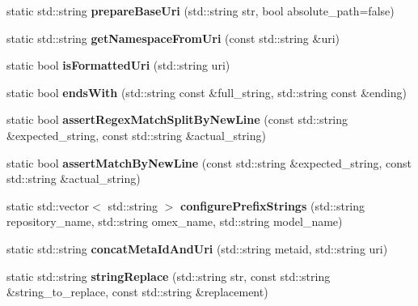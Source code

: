 \begin{DoxyCompactItemize}
static std\+::string {\bfseries prepare\+Base\+Uri} (std\+::string str, bool absolute\+\_\+path=false)
\item 
\mbox{\label{classomexmeta_1_1OmexMetaUtils_a0956bde073b212596d8e4b2ffc983e47}} 
static std\+::string {\bfseries get\+Namespace\+From\+Uri} (const std\+::string \&uri)
\item 
\mbox{\label{classomexmeta_1_1OmexMetaUtils_af663724f2efb0324a64c6a57e8491c13}} 
static bool {\bfseries is\+Formatted\+Uri} (std\+::string uri)
\item 
\mbox{\label{classomexmeta_1_1OmexMetaUtils_a9c2b712b85f74fff9740477660f7b371}} 
static bool {\bfseries ends\+With} (std\+::string const \&full\+\_\+string, std\+::string const \&ending)
\item 
\mbox{\label{classomexmeta_1_1OmexMetaUtils_a4ec81c80bf33d232331ea9ef0b94da61}} 
static bool {\bfseries assert\+Regex\+Match\+Split\+By\+New\+Line} (const std\+::string \&expected\+\_\+string, const std\+::string \&actual\+\_\+string)
\item 
\mbox{\label{classomexmeta_1_1OmexMetaUtils_a6ddc16d56f238ef7ff3c8ab355163ef7}} 
static bool {\bfseries assert\+Match\+By\+New\+Line} (const std\+::string \&expected\+\_\+string, const std\+::string \&actual\+\_\+string)
\item 
\mbox{\label{classomexmeta_1_1OmexMetaUtils_a744a0575136f1cc60b76a6560a5595e9}} 
static std\+::vector$<$ std\+::string $>$ {\bfseries configure\+Prefix\+Strings} (std\+::string repository\+\_\+name, std\+::string omex\+\_\+name, std\+::string model\+\_\+name)
\item 
\mbox{\label{classomexmeta_1_1OmexMetaUtils_ae645af49ce57dac8bd0e0eba9e39a6c0}} 
static std\+::string {\bfseries concat\+Meta\+Id\+And\+Uri} (std\+::string metaid, std\+::string uri)
\item 
\mbox{\label{classomexmeta_1_1OmexMetaUtils_aca2230ca99338b9dc0fc7d296b0c553b}} 
static std\+::string {\bfseries string\+Replace} (std\+::string str, const std\+::string \&string\+\_\+to\+\_\+replace, const std\+::string \&replacement)

\end{DoxyCompactItemize}
